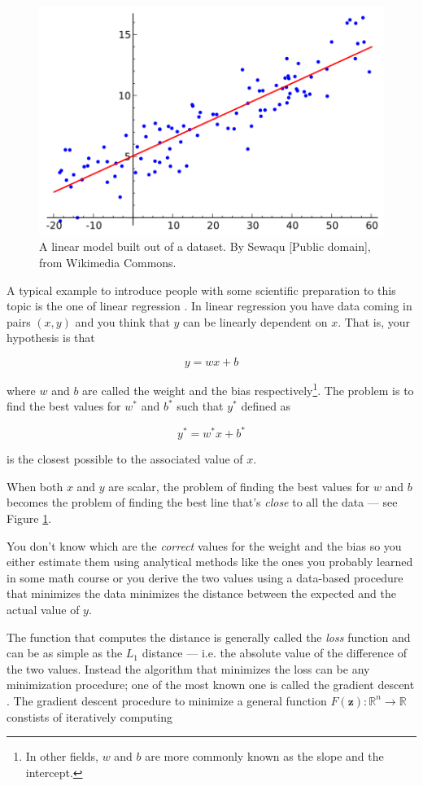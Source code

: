 \begin{figure}
  \centering
  \includegraphics[width=0.5\linewidth]{Images/wikipedia-linear-regression.png}
  \caption{A linear model built out of a dataset. By Sewaqu [Public
      domain], from Wikimedia Commons.}
  \label{fig:wikipedia-linear-regression}
\end{figure}

A typical example to introduce people with some scientific preparation
to this topic is the one of linear regression \cite{B071JXYDDB}. In
linear regression you have data coming in pairs $(x, y)$ and you think
that $y$ can be linearly dependent on $x$. That is, your hypothesis is
that

\begin{equation}
  y = w x + b
  \label{eq:linear-model}
\end{equation}

where $w$ and $b$ are called the weight and the bias
respectively\footnote{In other fields, $w$ and $b$ are more commonly
  known as the slope and the intercept.}. The problem is to find the
best values for $w^*$ and $b^*$ such that $y^*$ defined as

\[ y^* = w^* x + b^* \]

is the closest possible to the associated value of $x$.

When both $x$ and $y$ are scalar, the problem of finding the best
values for $w$ and $b$ becomes the problem of finding the best line
that's \emph{close} to all the data --- see Figure
\ref{fig:wikipedia-linear-regression}.

You don't know which are the \emph{correct} values for the weight and
the bias so you either estimate them using analytical methods like the ones
you probably learned in some math course or you derive the two values
using a data-based procedure that minimizes the data minimizes the
distance between the expected and the actual value of $y$.

The function that computes the distance is generally called the
\emph{loss} function and can be as simple as the $L_1$ distance
\cite{taxicab-geometry} --- i.e. the absolute value of the difference
of the two values. Instead the algorithm that minimizes the loss can be
any minimization procedure; one of the most known one is called the
gradient descent \cite{Goodfellow-et-al-2016}. The gradient descent
procedure to minimize a general function $F(\boldsymbol{z}):
\mathbb{R}^n \rightarrow \mathbb{R}$ constists of iteratively computing


